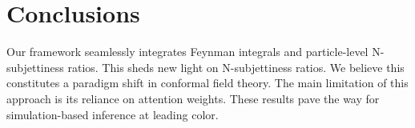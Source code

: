 \section{Conclusions}\label{sec:conclusions}

Our framework seamlessly integrates Feynman integrals and particle-level
N-subjettiness ratios. This sheds new light on N-subjettiness ratios. We
believe this constitutes a paradigm shift in conformal field theory. The
main limitation of this approach is its reliance on attention weights.
These results pave the way for simulation-based inference at leading
color.

